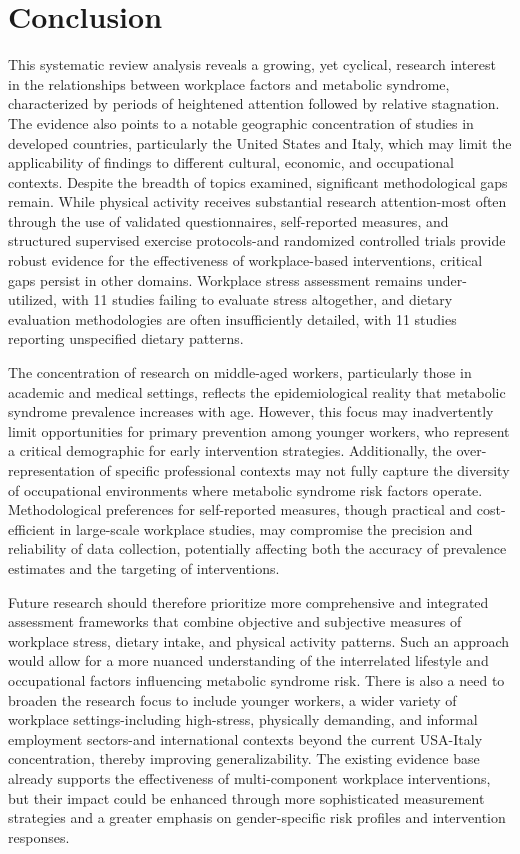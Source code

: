 \section{Conclusion}
This systematic review analysis reveals a growing, yet cyclical, research interest in the relationships between workplace factors and metabolic syndrome, characterized by periods of heightened attention followed by relative stagnation. The evidence also points to a notable geographic concentration of studies in developed countries, particularly the United States and Italy, which may limit the applicability of findings to different cultural, economic, and occupational contexts. Despite the breadth of topics examined, significant methodological gaps remain. While physical activity receives substantial research attention-most often through the use of validated questionnaires, self-reported measures, and structured supervised exercise protocols-and randomized controlled trials provide robust evidence for the effectiveness of workplace-based interventions, critical gaps persist in other domains. Workplace stress assessment remains under-utilized, with 11 studies failing to evaluate stress altogether, and dietary evaluation methodologies are often insufficiently detailed, with 11 studies reporting unspecified dietary patterns.\par
The concentration of research on middle-aged workers, particularly those in academic and medical settings, reflects the epidemiological reality that metabolic syndrome prevalence increases with age. However, this focus may inadvertently limit opportunities for primary prevention among younger workers, who represent a critical demographic for early intervention strategies. Additionally, the over-representation of specific professional contexts may not fully capture the diversity of occupational environments where metabolic syndrome risk factors operate. Methodological preferences for self-reported measures, though practical and cost-efficient in large-scale workplace studies, may compromise the precision and reliability of data collection, potentially affecting both the accuracy of prevalence estimates and the targeting of interventions.\par
Future research should therefore prioritize more comprehensive and integrated assessment frameworks that combine objective and subjective measures of workplace stress, dietary intake, and physical activity patterns. Such an approach would allow for a more nuanced understanding of the interrelated lifestyle and occupational factors influencing metabolic syndrome risk. There is also a need to broaden the research focus to include younger workers, a wider variety of workplace settings-including high-stress, physically demanding, and informal employment sectors-and international contexts beyond the current USA-Italy concentration, thereby improving generalizability. The existing evidence base already supports the effectiveness of multi-component workplace interventions, but their impact could be enhanced through more sophisticated measurement strategies and a greater emphasis on gender-specific risk profiles and intervention responses.\par
